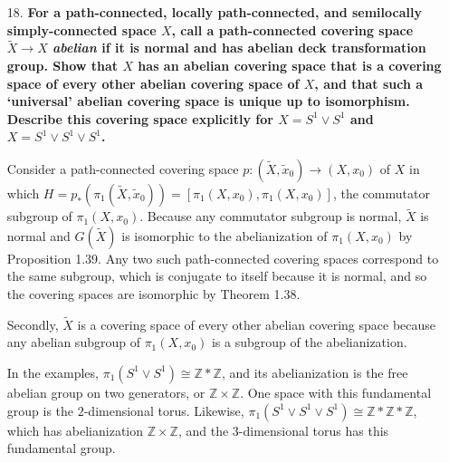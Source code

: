 \documentclass[a4paper,12pt]{article}
\begin{document}
\begin{enumerate}
    \item[18.]
        \sloppy
        \boldmath\textbf{For a path-connected, locally path-connected, and semilocally simply-connected space $X$, call a path-connected covering space $\tilde{X} \to X$ \emph{abelian} if it is normal and has abelian deck transformation group. Show that $X$ has an abelian covering space that is a covering space of every other abelian covering space of $X$, and that such a `universal' abelian covering space is unique up to isomorphism. Describe this covering space explicitly for $X = S^1 \lor S^1$ and $X = S^1 \lor S^1 \lor S^1$.
        }\unboldmath \par
        Consider a path-connected covering space $p : (\tilde{X}, \tilde{x}_0) \to (X, x_0)$ of $X$ in which $H = p_*(\pi_1(\tilde{X}, \tilde{x}_0)) = [\pi_1(X, x_0), \pi_1(X, x_0)]$, the commutator subgroup of $\pi_1(X, x_0)$. Because any commutator subgroup is normal, $\tilde{X}$ is normal and $G(\tilde{X})$ is isomorphic to the abelianization of $\pi_1(X, x_0)$ by Proposition 1.39. Any two such path-connected covering spaces correspond to the same subgroup, which is conjugate to itself because it is normal, and so the covering spaces are isomorphic by Theorem 1.38. \par
        Secondly, $\tilde{X}$ is a covering space of every other abelian covering space because any abelian subgroup of $\pi_1(X, x_0)$ is a subgroup of the abelianization. \par
        In the examples, $\pi_1(S^1 \lor S^1) \cong \mathbb{Z} * \mathbb{Z}$, and its abelianization is the free abelian group on two generators, or $\mathbb{Z} \times \mathbb{Z}$. One space with this fundamental group is the $2$-dimensional torus. Likewise, $\pi_1(S^1 \lor S^1 \lor S^1) \cong \mathbb{Z} * \mathbb{Z} * \mathbb{Z}$, which has abelianization $\mathbb{Z} \times \mathbb{Z}$, and the $3$-dimensional torus has this fundamental group.


\end{enumerate}
\end{document}
